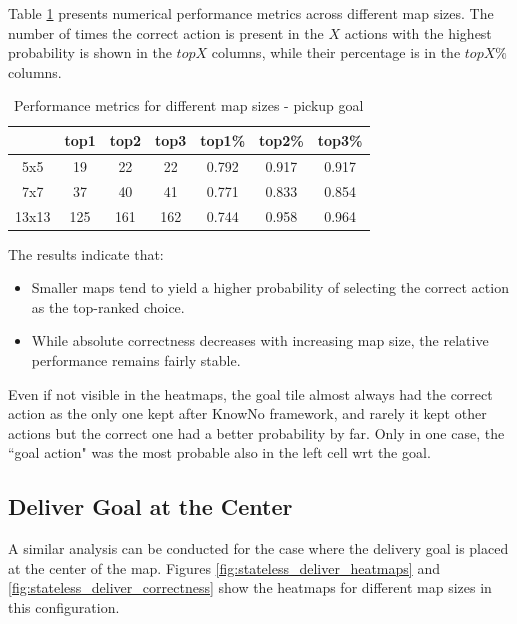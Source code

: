 Table \ref{tab:performance} presents numerical performance metrics across
different map sizes. The number of times the correct action is present in the $X$
actions with the highest probability is shown in the $topX$ columns, while their
percentage is in the $topX\%$ columns.

\vspace{5mm}
\begin{table}[h]
  \centering
  \begin{tabular}{c|ccc|ccc}
          & top1 & top2 & top3 & top1\% & top2\% & top3\% \\
    \hline
    5x5   & 19   & 22   & 22   & 0.792  & 0.917  & 0.917  \\
    7x7   & 37   & 40   & 41   & 0.771  & 0.833  & 0.854  \\
    13x13 & 125  & 161  & 162  & 0.744  & 0.958  & 0.964  \\
  \end{tabular}
  \caption{Performance metrics for different map sizes - pickup goal}
  \label{tab:performance}
\end{table}
\vspace{5mm}

The results indicate that:
\begin{itemize}
  \item Smaller maps tend to yield a higher probability of selecting the correct
    action as the top-ranked choice.

  \item While absolute correctness decreases with increasing map size, the
    relative performance remains fairly stable.
\end{itemize}

Even if not visible in the heatmaps, the goal tile almost always had the correct
action as the only one kept after KnowNo framework, and rarely it kept other actions
but the correct one had a better probability by far. Only in one case, the ``goal
action" was the most probable also in the left cell wrt the goal.

\subsection{Deliver Goal at the Center}

A similar analysis can be conducted for the case where the delivery goal is placed
at the center of the map. Figures \ref{fig:stateless_deliver_heatmaps} and
\ref{fig:stateless_deliver_correctness} show the heatmaps for different map
sizes in this configuration.


